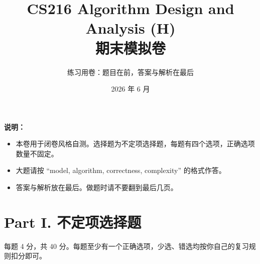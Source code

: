 \documentclass[UTF8,a4paper,11pt]{ctexart}
\title{\textbf{CS216 Algorithm Design and Analysis (H)\\期末模拟卷}}
\author{练习用卷：题目在前，答案与解析在最后}
\date{2026 年 6 月}
\begin{document}
\maketitle

\textbf{说明：}
\begin{itemize}
  \item 本卷用于闭卷风格自测。选择题为不定项选择题，每题有四个选项，正确选项数量不固定。
  \item 大题请按 ``model, algorithm, correctness, complexity'' 的格式作答。
  \item 答案与解析放在最后。做题时请不要翻到最后几页。
\end{itemize}

\section*{Part I. 不定项选择题}

每题 4 分，共 40 分。每题至少有一个正确选项，少选、错选均按你自己的复习规则扣分即可。
\end{document}
